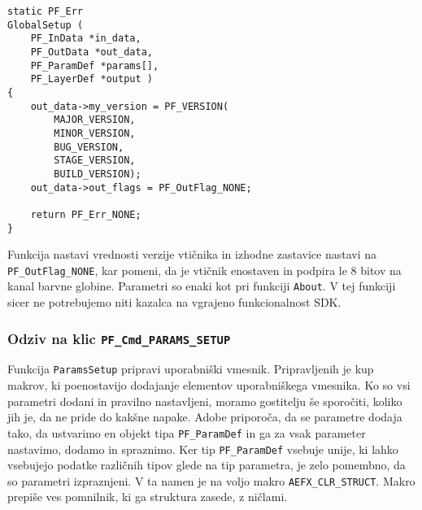 \documentclass[a4paper, 12pt]{book}
\begin{document}
\begin{verbatim}
static PF_Err 
GlobalSetup (   
    PF_InData *in_data,
    PF_OutData *out_data,
    PF_ParamDef *params[],
    PF_LayerDef *output )
{
    out_data->my_version = PF_VERSION(  
        MAJOR_VERSION, 
        MINOR_VERSION,
        BUG_VERSION, 
        STAGE_VERSION, 
        BUILD_VERSION);
    out_data->out_flags = PF_OutFlag_NONE;
    
    return PF_Err_NONE;
}
\end{verbatim}

Funkcija nastavi vrednosti verzije vtičnika in izhodne zastavice nastavi na \texttt{PF\_OutFlag\_NONE}, kar pomeni, da je vtičnik enostaven in podpira le 8 bitov na kanal barvne globine.
Parametri so enaki kot pri funkciji \texttt{About}.
V tej funkciji sicer ne potrebujemo niti kazalca na vgrajeno funkcionalnost SDK.

\subsubsection{Odziv na klic \texttt{PF\_Cmd\_PARAMS\_SETUP}}

Funkcija \texttt{ParamsSetup} pripravi uporabniški vmesnik.
Pripravljenih je kup makrov, ki poenostavijo dodajanje elementov uporabniškega vmesnika.
Ko so vsi parametri dodani in pravilno nastavljeni, moramo gostitelju še sporočiti, koliko jih je, da ne pride do kakšne napake.
Adobe priporoča, da se parametre dodaja tako, da ustvarimo en objekt tipa \texttt{PF\_ParamDef} in ga za vsak parameter nastavimo, dodamo in spraznimo.
Ker tip \texttt{PF\_ParamDef} vsebuje unije, ki lahko vsebujejo podatke različnih tipov glede na tip parametra, je zelo pomembno, da so parametri izpraznjeni.
V ta namen je na voljo makro \texttt{AEFX\_CLR\_STRUCT}.
Makro prepiše ves pomnilnik, ki ga struktura zasede, z ničlami.
\end{document}
